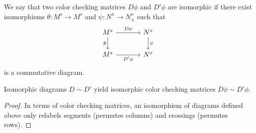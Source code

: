 We say that two color checking matrices $D\phi$ and $D'\phi$ are isomorphic if 
there exist isomorphisms $\theta:M^s\to M^s$ and $\psi:N^x\to N_\pm^x$ such that
$$
\begin{tikzcd}[column sep=large]
  M^s\arrow[r, "D\phi"]\arrow[d, "\theta" left] & N^x\arrow[d, "\psi" right]\\ 
  M^s\arrow[r, "D'\phi" below] & N^x
\end{tikzcd}
$$
is a commutative diagram. 

\begin{lemma}
  Isomorphic diagrams $D\sim D'$ yield isomorphic color checking matrices $D\phi\sim D'\phi$.
\end{lemma}

\begin{proof}
  In terms of color checking matrices, an isomorphism of diagrams defined above only relabels segments (permutes columns) and crossings (permutes rows).
\end{proof}










